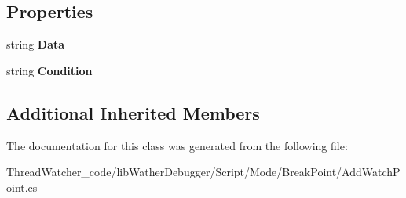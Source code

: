 \subsection*{Properties}
\begin{DoxyCompactItemize}
\item 
\hypertarget{classlib_wather_debugger_1_1_script_1_1_mode_1_1_break_point_1_1_add_watch_point_a6fee6aa55324508342e03549dbf80ea3}{string {\bfseries Data}}\label{classlib_wather_debugger_1_1_script_1_1_mode_1_1_break_point_1_1_add_watch_point_a6fee6aa55324508342e03549dbf80ea3}

\item 
\hypertarget{classlib_wather_debugger_1_1_script_1_1_mode_1_1_break_point_1_1_add_watch_point_aae33b7547c5937260a8c4eee6fb1b7a2}{string {\bfseries Condition}}\label{classlib_wather_debugger_1_1_script_1_1_mode_1_1_break_point_1_1_add_watch_point_aae33b7547c5937260a8c4eee6fb1b7a2}

\end{DoxyCompactItemize}
\subsection*{Additional Inherited Members}


The documentation for this class was generated from the following file\+:\begin{DoxyCompactItemize}
\item 
Thread\+Watcher\+\_\+code/lib\+Wather\+Debugger/\+Script/\+Mode/\+Break\+Point/Add\+Watch\+Point.\+cs\end{DoxyCompactItemize}
